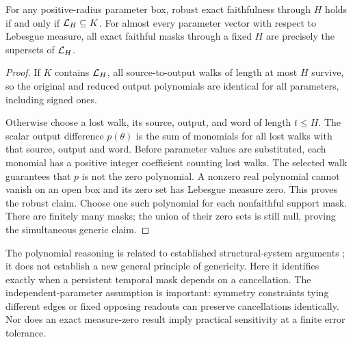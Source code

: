 \begin{theorem}\label{thm:generic}
For any positive-radius parameter box, robust exact faithfulness through $H$ holds if and only if $\mathcal L_H\subseteq K$. For almost every parameter vector with respect to Lebesgue measure, all exact faithful masks through a fixed $H$ are precisely the supersets of $\mathcal L_H$.
\end{theorem}
\begin{proof}
If $K$ contains $\mathcal L_H$, all source-to-output walks of length at most $H$ survive, so the original and reduced output polynomials are identical for all parameters, including signed ones.

Otherwise choose a lost walk, its source, output, and word of length $t\le H$. The scalar output difference $p(\theta)$ is the sum of monomials for all lost walks with that source, output and word. Before parameter values are substituted, each monomial has a positive integer coefficient counting lost walks. The selected walk guarantees that $p$ is not the zero polynomial. A nonzero real polynomial cannot vanish on an open box and its zero set has Lebesgue measure zero. This proves the robust claim. Choose one such polynomial for each nonfaithful support mask. There are finitely many masks; the union of their zero sets is still null, proving the simultaneous generic claim.
\end{proof}
The polynomial reasoning is related to established structural-system arguments \citep{zhang2021}; it does not establish a new general principle of genericity. Here it identifies exactly when a persistent temporal mask depends on a cancellation. The independent-parameter assumption is important: symmetry constraints tying different edges or fixed opposing readouts can preserve cancellations identically. Nor does an exact measure-zero result imply practical sensitivity at a finite error tolerance.

